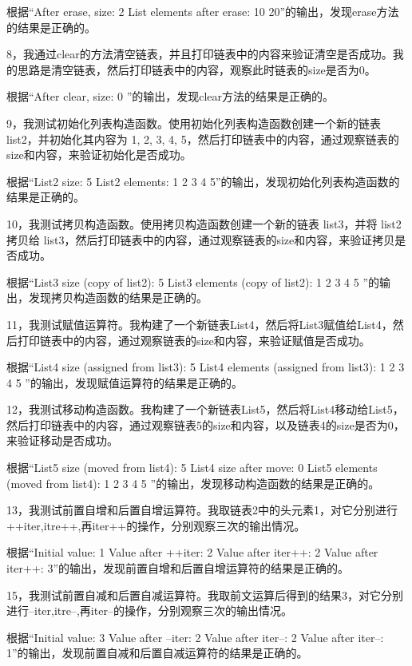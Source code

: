 \documentclass[UTF8]{ctexart}
\begin{document}
根据“After erase, size: 2  List elements after erase: 10 20”的输出，发现erase方法的结果是正确的。

8，我通过clear的方法清空链表，并且打印链表中的内容来验证清空是否成功。我的思路是清空链表，然后打印链表中的内容，观察此时链表的size是否为0。

根据“After clear, size: 0   ”的输出，发现clear方法的结果是正确的。

9，我测试初始化列表构造函数。使用初始化列表构造函数创建一个新的链表 list2，并初始化其内容为 {1, 2, 3, 4, 5}，然后打印链表中的内容，通过观察链表的size和内容，来验证初始化是否成功。

根据“List2 size: 5  List2 elements: 1 2 3 4 5”的输出，发现初始化列表构造函数的结果是正确的。

10，我测试拷贝构造函数。使用拷贝构造函数创建一个新的链表 list3，并将 list2 拷贝给 list3，然后打印链表中的内容，通过观察链表的size和内容，来验证拷贝是否成功。

根据“List3 size (copy of list2): 5  List3 elements (copy of list2): 1 2 3 4 5 ”的输出，发现拷贝构造函数的结果是正确的。

11，我测试赋值运算符。我构建了一个新链表List4，然后将List3赋值给List4，然后打印链表中的内容，通过观察链表的size和内容，来验证赋值是否成功。

根据“List4 size (assigned from list3): 5  List4 elements (assigned from list3): 1 2 3 4 5 ”的输出，发现赋值运算符的结果是正确的。

12，我测试移动构造函数。我构建了一个新链表List5，然后将List4移动给List5，然后打印链表中的内容，通过观察链表5的size和内容，以及链表4的size是否为0，来验证移动是否成功。

根据“List5 size (moved from list4): 5  List4 size after move: 0  List5 elements (moved from list4): 1 2 3 4 5 ”的输出，发现移动构造函数的结果是正确的。

13，我测试前置自增和后置自增运算符。我取链表2中的头元素1，对它分别进行++iter,itre++,再iter++的操作，分别观察三次的输出情况。

根据“Initial value: 1  Value after ++iter: 2  Value after iter++: 2  Value after iter++: 3”的输出，发现前置自增和后置自增运算符的结果是正确的。

15，我测试前置自减和后置自减运算符。我取前文运算后得到的结果3，对它分别进行--iter,itre--,再iter--的操作，分别观察三次的输出情况。

根据“Initial value: 3  Value after --iter: 2  Value after iter--: 2  Value after iter--: 1”的输出，发现前置自减和后置自减运算符的结果是正确的。
\end{document}
